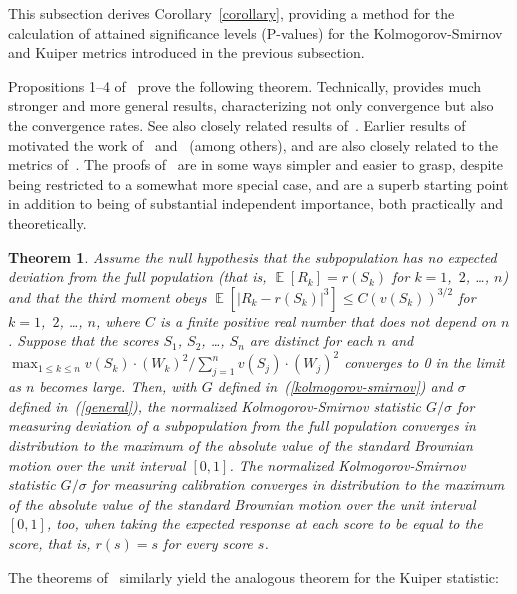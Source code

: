 \documentclass[12pt]{article}
\newtheorem{theorem}{Theorem}[]
\DeclareMathOperator{\E}{\mathop{}\mathbb{E}}
\begin{document}
This subsection derives Corollary~\ref{corollary},
providing a method for the calculation of attained significance levels
(P-values) for the Kolmogorov-Smirnov and Kuiper metrics introduced
in the previous subsection.

Propositions 1--4 of~\citet{diebolt} prove the following theorem.
Technically, \citet{diebolt} provides much stronger and more general results,
characterizing not only convergence but also the convergence rates.
See also closely related results of~\citet{stute}.
Earlier results of~\citet{delgado} motivated the work
of~\citet{diebolt} and~\citet{stute} (among others),
and are also closely related to the metrics of~\citet{tygert_two}.
The proofs of~\citet{delgado} are in some ways simpler and easier to grasp,
despite being restricted to a somewhat more special case,
and are a superb starting point in addition to being of substantial
independent importance, both practically and theoretically.

\begin{theorem}
\label{kscal}
Assume the null hypothesis that the subpopulation has no expected deviation
from the full population (that is, $\E[R_k] = r(S_k)$
for $k = 1$,~$2$, \dots, $n$) and that the third moment obeys
$\E[|R_k - r(S_k)|^3] \le C (v(S_k))^{3/2}$ for $k = 1$,~$2$, \dots, $n$,
where $C$ is a finite positive real number that does not depend on $n$.
Suppose that the scores $S_1$, $S_2$, \dots, $S_n$ are distinct for each $n$
and
$\max_{1 \le k \le n} v(S_k) \cdot (W_k)^2 / \sum_{j=1}^n v(S_j) \cdot (W_j)^2$
converges to 0 in the limit as $n$ becomes large.
Then, with $G$ defined in~(\ref{kolmogorov-smirnov})
and $\sigma$ defined in~(\ref{general}),
the normalized Kolmogorov-Smirnov statistic $G/\sigma$
for measuring deviation of a subpopulation from the full population
converges in distribution to the maximum of the absolute value
of the standard Brownian motion over the unit interval $[0, 1]$.
The normalized Kolmogorov-Smirnov statistic $G/\sigma$
for measuring calibration converges in distribution
to the maximum of the absolute value of the standard Brownian motion
over the unit interval $[0, 1]$, too, when taking the expected response
at each score to be equal to the score, that is, $r(s) = s$
for every score $s$.
\end{theorem}

The theorems of~\citet{diebolt} similarly yield the analogous theorem
for the Kuiper statistic:
\end{document}
